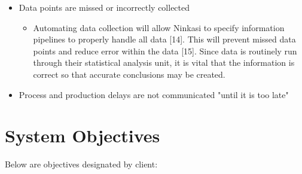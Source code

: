 \documentclass[draftclsnofoot,onecolumn,letterpaper,10pt]{IEEEtran}
\begin{document}
\begin{itemize}
\begin{itemize}
        \end{itemize}
\item {Data points are missed or incorrectly collected}
        \begin{itemize}
\item {Automating data collection will allow Ninkasi to specify information pipelines to properly handle all data [14]. This will prevent missed data points and reduce error within the data [15]. Since data is routinely run through their statistical analysis unit, it is vital that the information is correct so that accurate conclusions may be created.}
        \end{itemize}
\item {Process and production delays are not communicated "until it is too late"}
\end{itemize}


\section{\textbf{System Objectives}}
Below are objectives designated by client:
\end{document}
